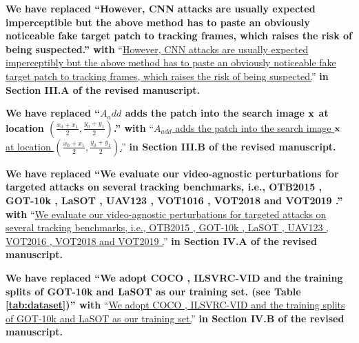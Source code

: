 \documentclass[12pt]{article}
\begin{document}
\textbf{We have replaced ``However, CNN attacks are usually expected imperceptible but the above method has to paste an obviously noticeable fake target patch to tracking frames, which raises the risk of being suspected.'' with}
``\uline{However, CNN attacks are usually expected imperceptibly but the above method has to paste an obviously noticeable fake target patch to tracking frames, which raises the risk of being suspected.}''
\textbf{in Section III.A of the revised manuscript.}

\textbf{We have  replaced ``$A_add$ adds the patch into the search image $\textbf x$ at location $(\frac{x_0+x_1}{2},\frac{y_0+y_1}{2})$.'' with}
``\uline{$A_{add}$ adds the patch into the search image $\textbf x$ at location $(\frac{x_0+x_1}{2},\frac{y_0+y_1}{2})$.}''
\textbf{in Section III.B of the revised manuscript.}

\textbf{We have replaced ``We evaluate our video-agnostic perturbations for targeted attacks on several tracking benchmarks, i.e., OTB2015 \cite{OTB}, GOT-10k \cite{GOT-10k}, LaSOT \cite{LaSOT}, UAV123 \cite{UAV123}, VOT1016 \cite{VOT2016}, VOT2018 \cite{VOT2018} and VOT2019 \cite{VOT2019}.'' with}
``\uline{We evaluate our video-agnostic perturbations for targeted attacks on several tracking benchmarks, i.e., OTB2015 \cite{OTB}, GOT-10k \cite{GOT-10k}, LaSOT \cite{LaSOT}, UAV123 \cite{UAV123}, VOT2016 \cite{VOT2016}, VOT2018 \cite{VOT2018} and VOT2019 \cite{VOT2019}.}''
\textbf{in Section IV.A of the revised manuscript.}

\textbf{We have replaced ``We adopt COCO \cite{COCO}, ILSVRC-VID \cite{VID} and the training splits of GOT-10k \cite{GOT-10k} and LaSOT \cite{LaSOT} as our training set. (see Table \ref{tab:dataset})'' with}
``\uline{We adopt COCO \cite{COCO}, ILSVRC-VID \cite{VID} and the training splits of GOT-10k \cite{GOT-10k} and LaSOT \cite{LaSOT} as our training set.}''
\textbf{in Section IV.B of the revised manuscript.}

\normalem


\end{document}
